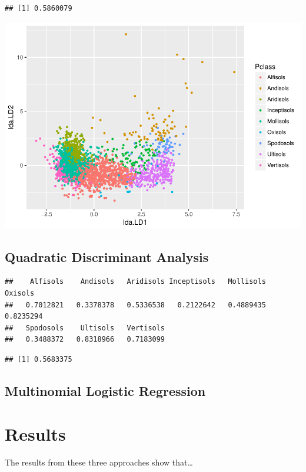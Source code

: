 \documentclass[]{article}
\begin{document}
\begin{verbatim}
## [1] 0.5860079
\end{verbatim}

\includegraphics{Project1_files/figure-latex/LDA - Fei-1.pdf}

\subsection{Quadratic Discriminant
Analysis}\label{quadratic-discriminant-analysis}

\begin{verbatim}
##    Alfisols    Andisols   Aridisols Inceptisols   Mollisols     Oxisols 
##   0.7012821   0.3378378   0.5336538   0.2122642   0.4889435   0.8235294 
##   Spodosols    Ultisols   Vertisols 
##   0.3488372   0.8318966   0.7183099
\end{verbatim}

\begin{verbatim}
## [1] 0.5683375
\end{verbatim}

\subsection{Multinomial Logistic
Regression}\label{multinomial-logistic-regression}

\section{Results}\label{results}

The results from these three approaches show that\ldots{}
\end{document}
